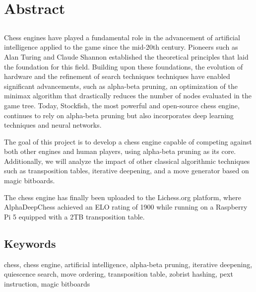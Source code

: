 \chapter*{Abstract}

\section*{\tituloPortadaEngVal}

Chess engines have played a fundamental role in the advancement of artificial intelligence applied to the game since the mid-20th century. Pioneers such as Alan Turing and Claude Shannon established the theoretical principles that laid the foundation for this field. Building upon these foundations, the evolution of hardware and the refinement of search techniques techniques have enabled significant advancements, such as alpha-beta pruning, an optimization of the minimax algorithm that drastically reduces the number of nodes evaluated in the game tree. Today, Stockfish, the most powerful and open-source chess engine, continues to rely on alpha-beta pruning but also incorporates deep learning techniques and neural networks.

\vspace{1em}

The goal of this project is to develop a chess engine capable of competing against both other engines and human players, using alpha-beta pruning as its core. Additionally, we will analyze the impact of other classical algorithmic techniques such as transposition tables, iterative deepening, and a move generator based on magic bitboards.

\vspace{1em}

The chess engine has finally been uploaded to the Lichess.org platform, where AlphaDeepChess achieved an ELO rating of 1900 while running on a Raspberry Pi 5 equipped with a 2TB transposition table.

\section*{Keywords}

\noindent chess, chess engine, artificial intelligence, alpha-beta pruning, iterative deepening, quiescence search, move ordering, transposition table, zobrist hashing, pext instruction, magic bitboards
